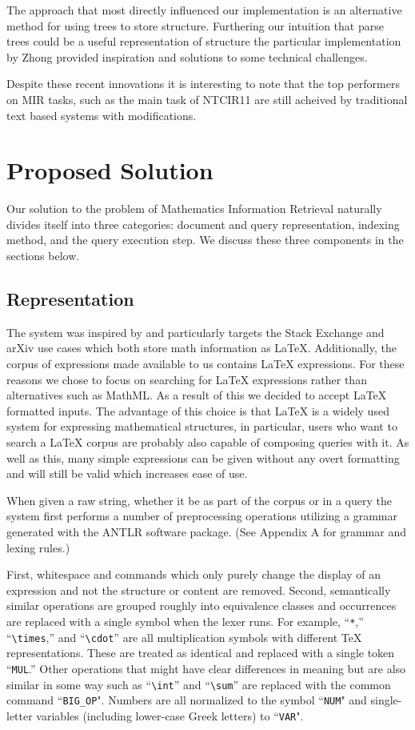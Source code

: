 \documentclass{sig-alternate}
\begin{document}
The approach that most directly influenced our implementation is an
alternative method for using trees to store structure. Furthering our
intuition that parse trees could be a useful representation of structure
the particular implementation by Zhong provided inspiration and 
solutions to some technical challenges.\cite{zhong:cowpie}

Despite these recent innovations it is interesting to note that the top performers on 
MIR tasks, such as the main task of NTCIR11 are still acheived by traditional text based
systems with modifications.

\section{Proposed Solution}
Our solution to the problem of Mathematics Information Retrieval naturally divides itself into three categories: document and query representation, indexing method, and the query execution step.  We discuss these three components in the sections below.

\subsection{Representation}
The system was inspired by and particularly targets the Stack Exchange
and arXiv use cases which both store math information as \LaTeX{}. 
Additionally, the corpus of expressions made available to us contains
\LaTeX{} expressions. For these reasons we chose to focus on searching
for \LaTeX{} expressions rather than alternatives such as MathML. As a 
result of this we decided to accept \LaTeX{} formatted inputs. The advantage
of this choice is that \LaTeX{} is a widely used system for expressing
mathematical structures, in particular, users who want to search
a \LaTeX{} corpus are probably also capable of composing queries with it.
As well as this, many simple expressions can be given without any 
overt formatting and will still be valid which increases ease of use.

When given a raw string, whether it be as part of the corpus or in 
a query the system first performs a number of preprocessing operations utilizing a grammar
generated with the ANTLR software package.  (See Appendix A for 
grammar and lexing rules.)

First, whitespace and commands which only purely change the display of an
expression and not the structure or content are removed. Second, 
semantically similar operations are grouped roughly into equivalence 
classes and occurrences are replaced with a single symbol when the lexer runs.
For example, ``\texttt{*},'' ``\texttt{\textbackslash times},'' and ``\texttt{\textbackslash cdot}'' are all multiplication symbols with different \TeX{} representations.  These are treated as identical and replaced with a single token ``\texttt{MUL}.'' Other operations that might have clear differences in meaning but are also
similar in some way such as ``\texttt{\textbackslash int}'' and ``\texttt{\textbackslash sum}'' are replaced with the common command ``\texttt{BIG\_OP}". Numbers are all normalized to the symbol ``\texttt{NUM}" and single-letter variables (including lower-case Greek letters) to ``\texttt{VAR}".
\end{document}
